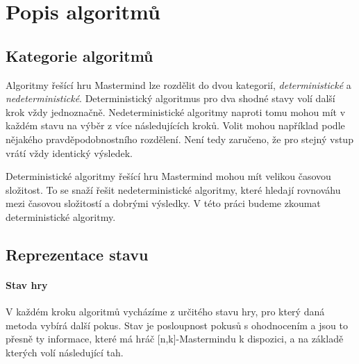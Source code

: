 \chapter{Popis algoritmů}
\section{Kategorie algoritmů}
Algoritmy řešící hru Mastermind lze rozdělit do dvou kategorií, \emph{deterministické} a \emph{nedeterministické}. Deterministický algoritmus pro dva shodné stavy volí další krok vždy jednoznačně. 
Nedeterministické algoritmy naproti tomu mohou mít v každém stavu na výběr z více následujících kroků. Volit mohou například podle nějakého pravděpodobnostního rozdělení. Není tedy zaručeno, že pro stejný vstup vrátí vždy identický výsledek.

Deterministické algoritmy řešící hru Mastermind mohou mít velikou časovou složitost. To se snaží řešit nedeterministické algoritmy, které hledají rovnováhu mezi časovou složitostí a dobrými výsledky. 
V této práci budeme zkoumat deterministické algoritmy. 


\section{Reprezentace stavu}

\subsubsection{Stav hry}
V každém kroku algoritmů vycházíme z určitého stavu hry, pro který daná metoda vybírá další pokus. Stav je posloupnost pokusů s ohodnocením a jsou to přesně ty informace, které má hráč [n,k]-Mastermindu k dispozici, a na základě kterých volí následující tah.

